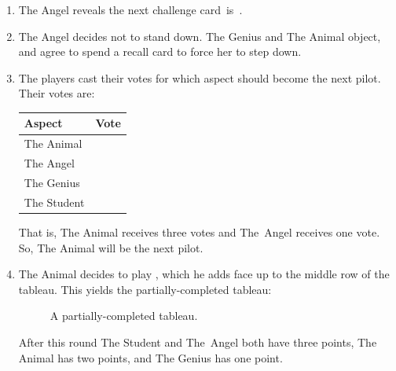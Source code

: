 \documentclass[a4paper, 10pt,notumble]{leaflet}
\DeclareRobustCommand\spades[1][black]{\textcolor{#1}{\cardfont{\}}}}
\DeclareRobustCommand\hearts[1][red]{\textcolor{#1}{{\cardfont{\{}}}}
\DeclareRobustCommand\diamonds[1][red]{\textcolor{#1}{{\cardfont{[}}}}
\DeclareRobustCommand\clubs[1][black]{\textcolor{#1}{\cardfont{]}}}
\DeclareRobustCommand\four[1][black]{\textcolor{#1}{\cardfont{4}}}
\DeclareRobustCommand\five[1][black]{\textcolor{#1}{\cardfont{5}}}
\DeclareRobustCommand\six[1][black]{\textcolor{#1}{\cardfont{6}}}
\DeclareRobustCommand\seven[1][black]{\textcolor{#1}{\cardfont{7}}}
\DeclareRobustCommand\eight[1][black]{\textcolor{#1}{\cardfont{8}}}
\DeclareRobustCommand\jack[1][black]{\textcolor{#1}{\cardfont{J}}}
\DeclareRobustCommand\queen[1][black]{\textcolor{#1}{\cardfont{Q}}}
\DeclareRobustCommand\ace[1][black]{\textcolor{#1}{\cardfont{A}}}
\DeclareRobustCommand\redace[1][red]{\textcolor{#1}{\cardfont{A}}}
\begin{document}
\begin{enumerate}
	\item The Angel reveals the next challenge card~is~\four[red]\hearts.
	\item The Angel decides not to stand down. The Genius and The Animal object, and agree to spend a recall card to force her to step down.
	\item The players cast their votes for which aspect should become the next pilot. Their votes are:

	\begin{table}[h]
	\centering
	\begin{tabular}{l r}
	\toprule
	Aspect & Vote \\ \midrule
	The Animal & \jack\clubs \\
	The Angel  & \queen[red]\hearts \\
	The Genius & \jack\spades \\
	The Student & \jack[red]\diamonds \\ \bottomrule
	\end{tabular}
	\end{table}
	
	That is, The Animal receives three votes and The~Angel receives one vote. So, The Animal will be the next pilot.
	\item The Animal decides to play \five\clubs, which he adds face up to the middle row of the tableau. This yields the partially-completed tableau:
	
\begin{figure}[h]\centering
{}
\caption*{A partially-completed tableau.}
\end{figure}

\bigskip
After this round The Student and The~Angel both have three points, The Animal has two points, and The Genius has one point.

\end{enumerate}
\end{document}
